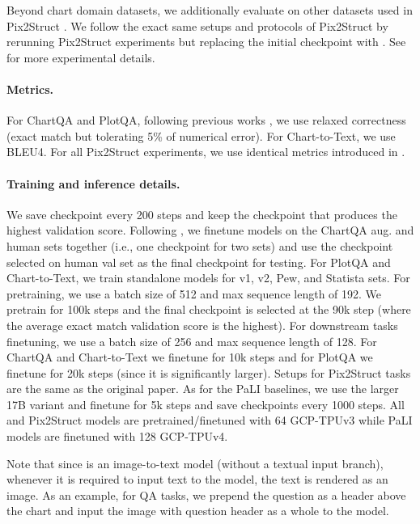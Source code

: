 Beyond chart domain datasets, we additionally evaluate on other datasets used in Pix2Struct \citep{lee2022pix2struct}. We follow the exact same setups and protocols of Pix2Struct by rerunning Pix2Struct experiments but replacing the initial checkpoint with \model{}. See \citet{lee2022pix2struct} for more experimental details. 

\paragraph{Metrics.} For ChartQA and PlotQA, following previous works \citep{masry-etal-2022-chartqa,methani2020plotqa,lee2022pix2struct}, we use relaxed correctness (exact match but tolerating 5\% of numerical error). For Chart-to-Text, we use BLEU4. For all Pix2Struct experiments, we use identical metrics introduced in \citet{lee2022pix2struct}.

\paragraph{Training and inference details.}
We save checkpoint every 200 steps and keep the checkpoint that produces the highest validation score.
Following \citet{lee2022pix2struct}, we finetune models on the ChartQA aug. and human sets together (i.e., one checkpoint for two sets) and use the checkpoint selected on human val set as the final checkpoint for testing.
For PlotQA and Chart-to-Text, we train standalone models for v1, v2, Pew, and Statista sets. For pretraining, we use a batch size of 512 and max sequence length of 192. We pretrain for 100k steps and the final \model{} checkpoint is selected at the 90k step (where the average exact match validation score is the highest).
For downstream tasks finetuning, we use a batch size of 256 and max sequence length of 128.
For ChartQA and Chart-to-Text we finetune for 10k steps and for PlotQA we finetune for 20k steps (since it is significantly larger). Setups for Pix2Struct tasks are the same as the original paper. As for the PaLI baselines, we use the larger 17B variant and finetune for 5k steps and save checkpoints every 1000 steps. All \model{} and Pix2Struct models are pretrained/finetuned with 64 GCP-TPUv3 while PaLI models are finetuned with 128 GCP-TPUv4.

Note that since \model{} is an image-to-text model (without a textual input branch), whenever it is required to input text to the model, the text is rendered as an image. As an example, for QA tasks, we prepend the question as a header above the chart and input the image with question header as a whole to the model. 


